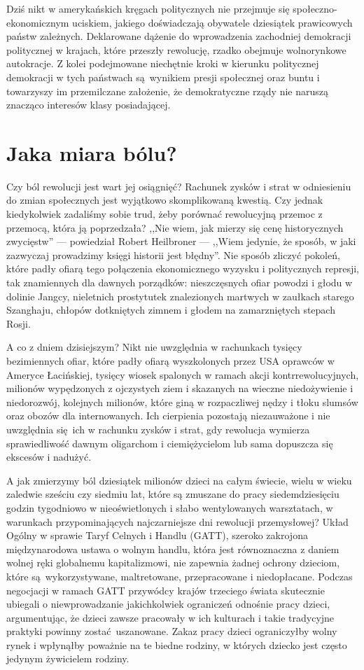 \documentclass[12pt]{book}
\newcommand{\sekcja}[1]{
  \addcontentsline{toc}{section}{#1}
  \section*{#1}
}
\begin{document}
Dziś nikt w amerykańskich kręgach politycznych nie przejmuje się społeczno-ekonomicznym uciskiem, jakiego doświadczają obywatele dziesiątek prawicowych państw zależnych. Deklarowane dążenie do wprowadzenia zachodniej demokracji politycznej w krajach, które przeszły rewolucję, rzadko obejmuje wolnorynkowe autokracje. Z kolei podejmowane niechętnie kroki w kierunku politycznej demokracji w tych państwach są wynikiem presji społecznej oraz buntu i towarzyszy im przemilczane założenie, że demokratyczne rządy nie naruszą znacząco interesów klasy posiadającej.

\sekcja{Jaka miara bólu?}
Czy ból rewolucji jest wart jej osiągnięć? Rachunek zysków i strat w odniesieniu do zmian społecznych jest wyjątkowo skomplikowaną kwestią. Czy jednak kiedykolwiek zadaliśmy sobie trud, żeby porównać rewolucyjną przemoc z przemocą, która ją poprzedzała? ,,Nie wiem, jak mierzy się cenę historycznych zwycięstw'' — powiedział Robert Heilbroner — ,,Wiem jedynie, że sposób, w jaki zazwyczaj prowadzimy księgi historii jest błędny''. Nie sposób zliczyć pokoleń, które padły ofiarą tego połączenia ekonomicznego wyzysku i politycznych represji, tak znamiennych dla dawnych porządków: nieszczęsnych ofiar powodzi i głodu w dolinie Jangcy, nieletnich prostytutek znalezionych martwych w zaułkach starego Szanghaju, chłopów dotkniętych zimnem i głodem na zamarzniętych stepach Rosji.

A co z dniem dzisiejszym? Nikt nie uwzględnia w rachunkach tysięcy bezimiennych ofiar, które padły ofiarą wyszkolonych przez USA oprawców w Ameryce Łacińskiej, tysięcy wiosek spalonych w ramach akcji kontrrewolucyjnych, milionów wypędzonych z ojczystych ziem i skazanych na wieczne niedożywienie i niedorozwój, kolejnych milionów, które giną w rozpaczliwej nędzy i tłoku slumsów oraz obozów dla internowanych. Ich cierpienia pozostają niezauważone i nie uwzględnia się ich w rachunku zysków i strat, gdy rewolucja wymierza sprawiedliwość dawnym oligarchom i ciemiężycielom lub sama dopuszcza się ekscesów i nadużyć.

A jak zmierzymy ból dziesiątek milionów dzieci na całym świecie, wielu w wieku zaledwie sześciu czy siedmiu lat, które są zmuszane do pracy siedemdziesięciu godzin tygodniowo w nieoświetlonych i słabo wentylowanych warsztatach, w warunkach przypominających najczarniejsze dni rewolucji przemysłowej? Układ Ogólny w sprawie Taryf Celnych i Handlu (GATT), szeroko zakrojona międzynarodowa ustawa o wolnym handlu, która jest równoznaczna z daniem wolnej ręki globalnemu kapitalizmowi, nie zapewnia żadnej ochrony dzieciom, które są wykorzystywane, maltretowane, przepracowane i niedopłacane. Podczas negocjacji w ramach GATT przywódcy krajów trzeciego świata skutecznie ubiegali o niewprowadzanie jakichkolwiek ograniczeń odnośnie pracy dzieci, argumentując, że dzieci zawsze pracowały w ich kulturach i takie tradycyjne praktyki powinny zostać uszanowane. Zakaz pracy dzieci ograniczyłby wolny rynek i wpłynąłby poważnie na te biedne rodziny, w których dziecko jest często jedynym żywicielem rodziny.
\end{document}
